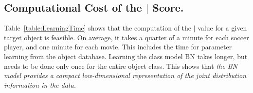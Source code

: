 {					\subsection{Computational Cost of the $\mid$ Score.}
					Table~\ref{table:LearningTime} shows that the computation of the $\mid$ value for a given target object is feasible. On average, it takes a quarter of a minute for each soccer player, and one minute for each movie. This includes the time for parameter learning from the object database.
					Learning the class model BN takes longer, but needs to be done only once for the entire object class. 
					This shows that {\em the BN model 
						provides a compact 
						low-dimensional representation of the joint distribution information in the data.}
					
					\begin{table}[htbp]
						\centering
						\begin{subtable}
							\centering
			
\end{subtable}
\end{table}}
